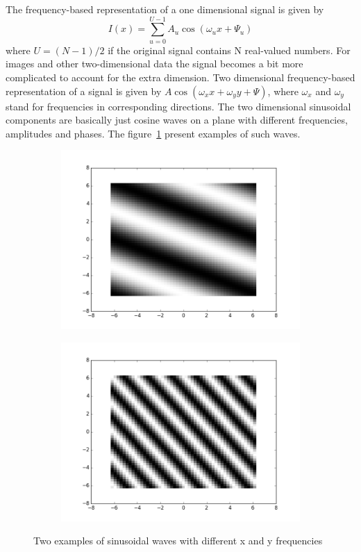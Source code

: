 \documentclass[]{article}
\begin{document}
The frequency-based representation of a one dimensional signal is given by
\begin{equation}
  I(x) = \sum_{u=0}^{U-1}{A_{u}\cos(\omega_{u}x+\Psi_{u})}
\end{equation}
where $U = (N-1)/2$ if the original signal contains N real-valued numbers. For
images and other two-dimensional data the signal becomes a bit more complicated
to account for the extra dimension. Two dimensional frequency-based
representation of a signal is given by $A \cos(\omega_{x} x + \omega_{y} y +
\Psi)$, where $\omega_{x}$ and $\omega_{y}$ stand for frequencies in
corresponding directions. The two dimensional sinusoidal components are
basically just cosine waves on a plane with different frequencies, amplitudes
and phases. The figure~\ref{fig:sinusoidal-waves} present examples of such waves.
\begin{figure}
  \centering
    \begin{subfigure}[t]{0.49\textwidth}
      \centering
      \includegraphics[width=0.99\linewidth]{sinusoidal1.png}
    \end{subfigure}
    \begin{subfigure}[t]{0.49\textwidth}
      \centering
      \includegraphics[width=0.99\linewidth]{sinusoidal2.png}
    \end{subfigure}
    \caption{Two examples of sinusoidal waves with different x and y
    frequencies}
    \label{fig:sinusoidal-waves}
\end{figure}
\end{document}
